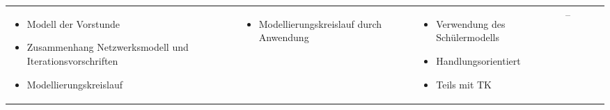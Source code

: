 \begin{landscape}
\begin{longtable}{|C{0.05\textwidth}|L{0.2\textwidth}|L{0.3\textwidth}|L{0.25\textwidth}|L{0.3\textwidth}|L{0.25\textwidth}|L{0.1\textwidth}|}
\begin{itemize}
	\item Modell der Vorstunde
	\item Zu\-sam\-men\-hang Netzwerksmodell und Iterationsvorschriften
	\item Modellierungs\-kreislauf
\end{itemize}&\begin{itemize}
	\item Modellierungs\-kreislauf durch Anwendung
\end{itemize}&\begin{itemize}
	\item Verwendung des Schülermodells
	\item Hand\-lungs\-o\-ri\-en\-tiert
	\item Teils mit TK
\end{itemize}&--\\
\end{longtable}
\end{landscape}